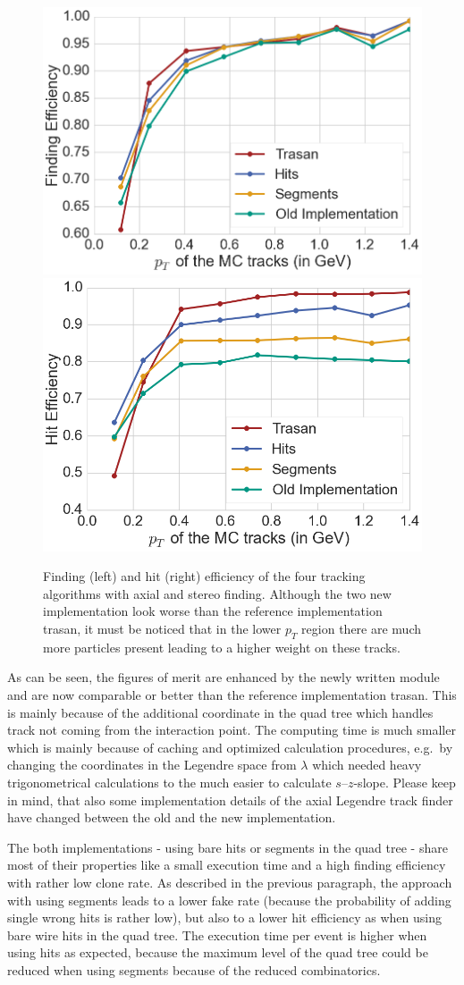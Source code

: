 \begin{figure}
  \includegraphics[width=0.48\linewidth]{figures/workflow/stereo_finding_efficiency.png}
  \includegraphics[width=0.48\linewidth]{figures/workflow/stereo_hit_efficiency.png}
  \caption{Finding (left) and hit (right) efficiency of the four tracking algorithms with axial and stereo finding. Although the two new implementation look worse than the reference implementation trasan, it must be noticed that in the lower $p_T$ region there are much more particles present leading to a higher weight on these tracks.}
  \label{fig-stereo-results}
\end{figure}

As can be seen, the figures of merit are enhanced by the newly written module and are now comparable or better than the reference implementation trasan. This is mainly because of the additional coordinate in the quad tree which handles track not coming from the interaction point. The computing time is much smaller which is mainly because of caching and optimized calculation procedures, e.g.\ by changing the coordinates in the Legendre space from $\lambda$ which needed heavy trigonometrical calculations to the much easier to calculate $s$--$z$-slope. Please keep in mind, that also some implementation details of the axial Legendre track finder have changed between the old and the new implementation.

The both implementations - using bare hits or segments in the quad tree - share most of their properties like a small execution time and a high finding efficiency with rather low clone rate. As described in the previous paragraph, the approach with using segments leads to a lower fake rate (because the probability of adding single wrong hits is rather low), but also to a lower hit efficiency as when using bare wire hits in the quad tree. The execution time per event is higher when using hits as expected, because the maximum level of the quad tree could be reduced when using segments because of the reduced combinatorics. 

